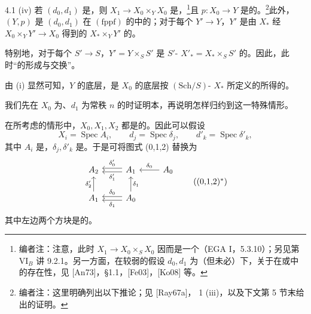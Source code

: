 \begin{SGAresult}{}{4.1}
(iv) 若 $(d_0,d_1)$ 是，则 $X_1\to X_0\times_YX_0$ 是，\footnote{编者注：注意，此时 $X_1\to X_0\times_SX_0$ 因而是一个（EGA I，5.3.10）；另见第 VI$_B$ 讲 9.2.1。另一方面，在较弱的假设 $d_0,d_1$ 为（但未必）下，关于在或中的存在性，见 [An73]，§1.1，[Fe03]，[Ko08] 等。}且 $p:X_0\to Y$ 是的。\footnote{编者注：这里明确列出以下推论；见 [Ray67a]， 1 (iii)，以及下文第 5 节末给出的证明。}此外，$(Y,p)$ 是 $(d_0,d_1)$ 在 $(\mathrm{fppf})$ 的中的；对于每个 $Y'\to Y$，$Y'$ 是由 $X_*$ 经 $X_0\times_YY'\to X_0$ 得到的 $X_*\times_YY'$ 的。

特别地，对于每个 $S'\to S$，$Y'=Y\times_SS'$ 是 $S'$- $X'_*=X_*\times_SS'$ 的。因此，此时“的形成与交换”。
\end{SGAresult}
由 (i) 显然可知，$Y$ 的底层，是 $X_0$ 的底层按 $(\mathrm{Sch}/S)$- $X_*$ 所定义的所得的。

我们先在 $X_0$ 为、$d_1$ 为常秩 $n$ 的时证明本，再说明怎样归约到这一特殊情形。

在所考虑的情形中，$X_0,X_1,X_2$ 都是的。因此可以假设
\[X_i=\operatorname{Spec}A_i,\qquad d_j=\operatorname{Spec}\delta_j,\qquad d'_k=\operatorname{Spec}\delta'_k,\]
其中 $A_i$ 是，$\delta_j,\delta'_k$ 是。于是可将图式 (0,1,2) 替换为
\[
\begin{tikzcd}
A_2&A_1\arrow[l,shift left=.5ex,"\delta'_1"]\arrow[l,shift right=.5ex,"\delta'_0"']&A_0\arrow[l,"\delta_0"']\\
A_1\arrow[u,"\delta'_2"]&A_0\arrow[u,"\delta_1"']\arrow[l,shift left=.5ex,"\delta_1"]\arrow[l,shift right=.5ex,"\delta_0"']&
\end{tikzcd}\tag{(0,1,2)$^*$}
\]
其中左边两个方块是的。

